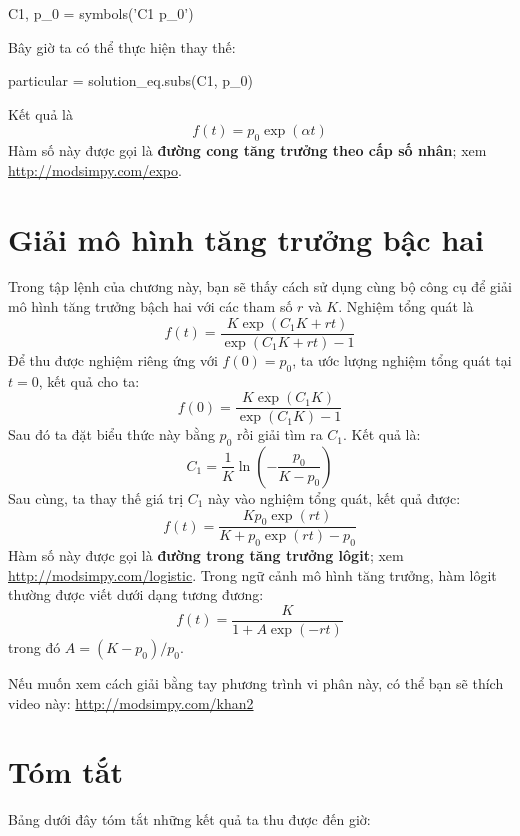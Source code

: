 \documentclass[12pt, openany]{book}
\theoremstyle{exercise}
\begin{document}

\begin{python}
C1, p_0 = symbols('C1 p_0')
\end{python}

Bây giờ ta có thể thực hiện thay thế:

\begin{python}
particular = solution_eq.subs(C1, p_0)
\end{python}

Kết quả là
%
\[ f{\left (t \right )} = p_{0} \exp(\alpha t) \]
%
Hàm số này được gọi là {\bf đường cong tăng trưởng theo cấp số nhân}; xem \url{http://modsimpy.com/expo}.



\section{Giải mô hình tăng trưởng bậc hai}

Trong tập lệnh của chương này, bạn sẽ thấy cách sử dụng cùng bộ công cụ để giải mô hình tăng trưởng bậch hai với các tham số $r$ và $K$.  Nghiệm tổng quát là 
%
\[ f{\left (t \right )} = \frac{K \exp(C_{1} K + r t)}{\exp(C_{1} K + r t) - 1} \]
%
Để thu được nghiệm riêng ứng với $f(0) = p_0$, ta ước lượng nghiệm tổng quát tại $t=0$, kết quả cho ta:
%
\[ f(0) = \frac{K \exp(C_{1} K)}{\exp(C_{1} K) - 1} \]
%
Sau đó ta đặt biểu thức này bằng $p_0$ rồi giải tìm ra $C_1$.  Kết quả là:
%
\[ C_1 = \frac{1}{K} \ln{\left (- \frac{p_{0}}{K - p_{0}} \right )} \]
%
Sau cùng, ta thay thế giá trị $C_1$ này vào nghiệm tổng quát, kết quả được:
%
\[ f(t) = \frac{K p_{0} \exp(r t)}{K + p_{0} \exp(r t) - p_{0}} \]
%
Hàm số này được gọi là {\bf đường trong tăng trưởng lôgit}; xem \url{http://modsimpy.com/logistic}.  Trong ngữ cảnh mô hình tăng trưởng, hàm lôgit thường được viết dưới dạng tương đương:
%
\[ f(t) = \frac{K}{1 + A \exp(-rt)} \]
%
trong đó $A = (K - p_0) / p_0$.

Nếu muốn xem cách giải bằng tay phương trình vi phân này, có thể bạn sẽ 
thích video này: \url{http://modsimpy.com/khan2}


\section{Tóm tắt}

Bảng dưới đây tóm tắt những kết quả ta thu được đến giờ:
\end{document}
